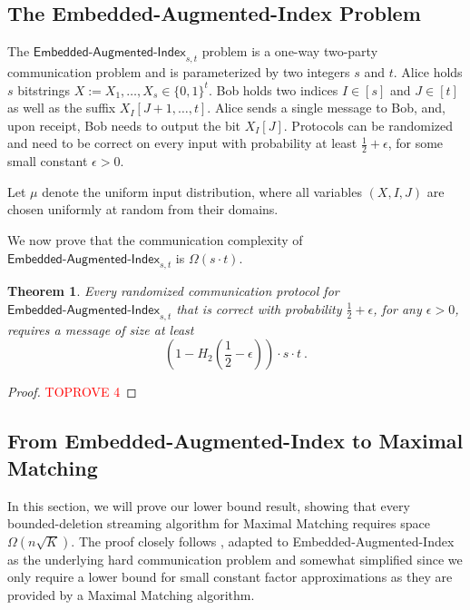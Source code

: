 \documentclass[11pt,a4paper]{article}
\newtheorem{theorem}{Theorem}
\begin{document}
\subsection{The \textsf{Embedded-Augmented-Index} Problem} \label{sec:embedded-augmented-index}
The $\textsf{Embedded-Augmented-Index}_{s,t}$ problem is a one-way two-party communication problem and is parameterized by two integers $s$ and $t$. Alice holds $s$ bitstrings $X := X_1, \dots, X_s \in \{0,1\}^{t}$. Bob holds two indices $I \in [s]$ and $J \in [t]$ as well as the suffix $X_I[J+1, \dots, t]$. Alice sends a single message to Bob, and, upon receipt, Bob needs to output the bit $X_I[J]$. Protocols can be randomized and need to be correct on every input with probability at least $\frac{1}{2} + \epsilon$, for some small constant $\epsilon > 0$.

Let $\mu$ denote the uniform input distribution, where all variables $(X, I, J)$ are chosen uniformly at random from their domains.

We now prove that the communication complexity of $\textsf{Embedded-Augmented-Index}_{s,t}$ is $\Omega(s \cdot t)$. 

\begin{theorem}\label{thm:embedded-aug-index}
    Every randomized communication protocol for $\textsf{Embedded-Augmented-Index}_{s,t}$ that is correct with probability $\frac{1}{2} + \epsilon$, for any $\epsilon > 0$, requires a message of size at least $$(1 - H_2(\frac{1}{2} - \epsilon)) \cdot s \cdot t \ .$$ 
\end{theorem}
\setcounter{counterEmbed}{\value{theorem}}

\begin{proof}\textcolor{red}{TOPROVE 4}\end{proof}


\subsection{From \textsf{Embedded-Augmented-Index} to \textsf{Maximal Matching}} \label{sec:reduction}

In this section, we will prove our lower bound result, showing that every bounded-deletion streaming algorithm for \textsf{Maximal Matching} requires space $\Omega(n \sqrt{K})$. The proof closely follows \cite{dk20}, adapted to \textsf{Embedded-Augmented-Index} as the underlying hard communication problem and somewhat simplified since we only require a lower bound for small constant factor approximations as they are provided by a \textsf{Maximal Matching} algorithm. 
\end{document}

